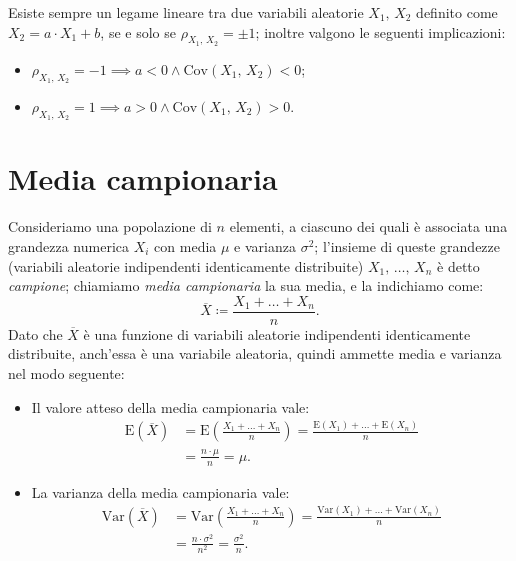         \begin{note}
            Esiste sempre un legame lineare tra due variabili aleatorie $X_1,\,X_2$ definito come $X_2 = a\cdot X_1 + b$, se e solo se $\rho_{X_1,\,X_2}=\pm 1$; inoltre valgono le seguenti implicazioni:
            \begin{itemize}
                \item $\rho_{X_1,\,X_2} = -1 \implies a<0 \land \text{Cov}(X_1,\,X_2)<0$;
                \item $\rho_{X_1,\,X_2} = 1 \implies a>0 \land \text{Cov}(X_1,\,X_2)>0$.
            \end{itemize}
        \end{note}
    \section{Media campionaria}\label{sec:Media_campionaria}
        \begin{defn}
            Consideriamo una popolazione di $n$ elementi, a ciascuno dei quali è associata una grandezza numerica $X_i$ con media $\mu$ e varianza $\sigma^2$; l'insieme di queste grandezze (variabili aleatorie indipendenti identicamente distribuite) $X_1,\, \ldots,\, X_{n}$ è detto \emph{campione}; chiamiamo \emph{media campionaria} la sua media, e la indichiamo come: \[
            \overline{X} \coloneqq \frac{X_1 + \ldots + X_{n}}{n}
            .\] Dato che $\overline{X}$ è una funzione di variabili aleatorie indipendenti identicamente distribuite, anch'essa è una variabile aleatoria, quindi ammette media e varianza nel modo seguente:
            \begin{itemize}
                \item Il valore atteso della media campionaria vale:
                    \begin{align*}
                        \text{E}(\overline{X}) &= \text{E}\left(\frac{X_1 + \ldots + X_n}{n}\right)
                        = \frac{\text{E}(X_1) + \ldots + \text{E}(X_n)}{n} \\
                        &= \frac{n \cdot \mu}{n} = \mu
                    .\end{align*}
                \item La varianza della media campionaria vale:
                    \begin{align*}
                        \text{Var}(\overline{X}) &= \text{Var}\left(\frac{X_1 + \ldots + X_n}{n}\right)
                        = \frac{\text{Var}(X_1) + \ldots + \text{Var}(X_n)}{n} \\
                        &= \frac{n\cdot \sigma^2}{n^2} = \frac{\sigma^2}{n}
                    .\end{align*}
            \end{itemize}
        \end{defn}
